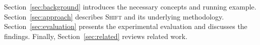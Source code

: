 \documentclass[a4paper,fleqn]{cas-sc}
\newcommand{\tool}{\textsc{Shift}}
\newcommand{\code}[1]{\texttt{\detokenize{#1}}}
\begin{document}
Section~\ref{sec:background} introduces the necessary concepts and running example. Section~\ref{sec:approach} describes \tool{} and its underlying methodology. Section~\ref{sec:evaluation} presents the experimental evaluation and discusses the findings. Finally, Section~\ref{sec:related} reviews related work.









\end{document}
